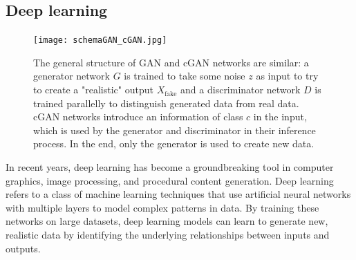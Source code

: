 





\subsection{Deep learning}

\begin{figure}[ht]
	\centering
	\texttt{[image: schemaGAN\_cGAN.jpg]}
    \caption{The general structure of GAN and cGAN networks are similar: a generator network $G$ is trained to take some noise $z$ as input to try to create a "realistic" output $X_{\text{fake}}$ and a discriminator network $D$ is trained parallelly to distinguish generated data from real data. cGAN networks introduce an information of class $c$ in the input, which is used by the generator and discriminator in their inference process. In the end, only the generator is used to create new data. }
    \label{fig:coral-island_GAN-scheme}
\end{figure}

In recent years, deep learning has become a groundbreaking tool in computer graphics, image processing, and procedural content generation. Deep learning refers to a class of machine learning techniques that use artificial neural networks with multiple layers to model complex patterns in data. By training these networks on large datasets, deep learning models can learn to generate new, realistic data by identifying the underlying relationships between inputs and outputs.

